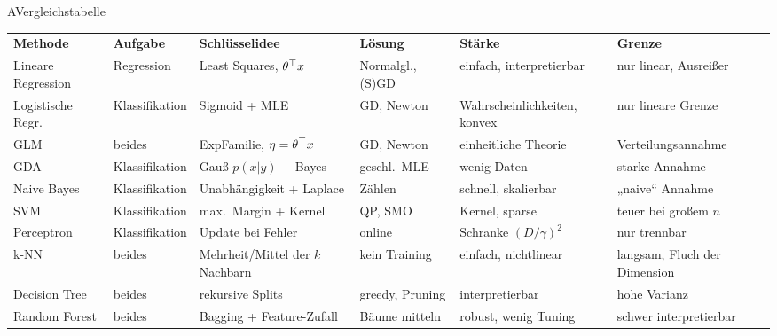 
\begin{hngrid}
%
\begin{hnp}[raster multicolumn=6,acc=hnnavy]{A}{Vergleichstabelle}
\setlength{\tabcolsep}{2.4pt}\renewcommand{\arraystretch}{1.42}\fontsize{7.5}{8.8}\selectfont
\newcommand{\tabhd}[1]{\textbf{#1}}
\begin{tabular}{@{}>{\raggedright\arraybackslash}p{2.55cm}>{\raggedright\arraybackslash}p{1.95cm}>{\raggedright\arraybackslash}p{4.1cm}>{\raggedright\arraybackslash}p{2.85cm}>{\raggedright\arraybackslash}p{3.35cm}>{\raggedright\arraybackslash}p{3.3cm}@{}}
\rowcolor{hnnavy!12}\tabhd{Methode}&\tabhd{Aufgabe}&\tabhd{Schlüsselidee}&\tabhd{Lösung}&\tabhd{Stärke}&\tabhd{Grenze}\\
\rowcolor{hnorange!10}Lineare Regression&Regression&Least Squares, $\theta^{\top} x$&Normalgl., (S)GD&einfach, interpretierbar&nur linear, Ausreißer\\
\rowcolor{hnorange!10}Logistische Regr.&Klassifikation&Sigmoid + MLE&GD, Newton&Wahrscheinlichkeiten, konvex&nur lineare Grenze\\
\rowcolor{hnorange!10}GLM&beides&ExpFamilie, $\eta=\theta^{\top} x$&GD, Newton&einheitliche Theorie&Verteilungsannahme\\
\rowcolor{hnorange!10}GDA&Klassifikation&Gauß $p(x|y)$ + Bayes&geschl.\ MLE&wenig Daten&starke Annahme\\
\rowcolor{hnorange!10}Naive Bayes&Klassifikation&Unabhängigkeit + Laplace&Zählen&schnell, skalierbar&„naive“ Annahme\\
\rowcolor{hnorange!10}SVM&Klassifikation&max.\ Margin + Kernel&QP, SMO&Kernel, sparse&teuer bei großem $n$\\
\rowcolor{hnorange!10}Perceptron&Klassifikation&Update bei Fehler&online&Schranke $(D/\gamma)^2$&nur trennbar\\
\rowcolor{hnorange!10}k-NN&beides&Mehrheit/Mittel der $k$ Nachbarn&kein Training&einfach, nichtlinear&langsam, Fluch der Dimension\\
\rowcolor{hnorange!10}Decision Tree&beides&rekursive Splits&greedy, Pruning&interpretierbar&hohe Varianz\\
\rowcolor{hnorange!10}Random Forest&beides&Bagging + Feature-Zufall&Bäume mitteln&robust, wenig Tuning&schwer interpretierbar\\

\end{tabular}
\end{hnp}
\end{hngrid}
